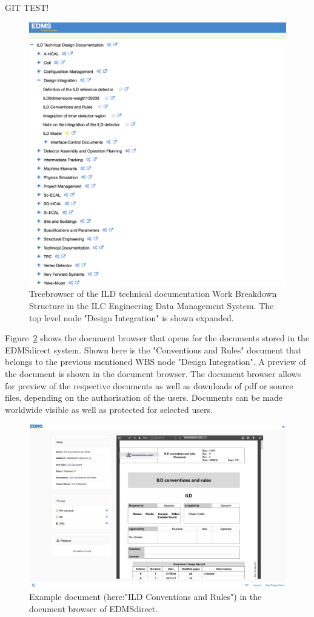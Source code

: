 GIT TEST!

\begin{figure}[t!]

\includegraphics[width=0.8\hsize]{Integration/fig/EDMS_direct.png}

\caption{\label{ild:fig:integration:edmsdirect}Treebrowser of the ILD technical documentation Work Breakdown Structure in the ILC Engineering Data Management System. The top level node "Design Integration" is shown expanded.}
\end{figure}

Figure~\ref{ild:fig:integration:edmsdirect_document} shows the document browser that opens for the documents stored in the EDMSdirect system. Shown here is the "Conventions and Rules" document that belongs to the previous mentioned WBS node "Design Integration". A preview of the document is shown in the document browser. The document browser allows for preview of the respective documents as well as downloads of pdf or source files, depending on the authorisation of the users. Documents can be made worldwide visible as well as protected for selected users.

\begin{figure}[t!]

\includegraphics[width=0.8\hsize]{Integration/fig/EDMS_direct_document.png}

\caption{\label{ild:fig:integration:edmsdirect_document}Example document (here:"ILD Conventions and Rules") in the document browser of EDMSdirect.}
\end{figure}
